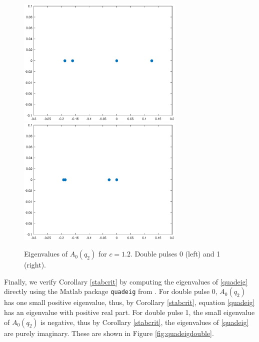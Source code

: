 \documentclass[12pt]{article}
\begin{document}
\begin{figure}[H]
\centering
\includegraphics[width=8cm]{specA0d1}
\includegraphics[width=8cm]{specA0d2}
\caption{Eigenvalues of $A_0(q_2)$ for $c = 1.2$. Double pulses 0 (left) and 1 (right).}
\label{fig:specA0double}
\end{figure}

Finally, we verify Corollary \ref{stabcrit} by computing the eigenvalues of \eqref{quadeig} directly using the Matlab package \texttt{quadeig} from \cite{Hammarling2013}. For double pulse 0, $A_0(q_2)$ has one small positive eigenvalue, thus, by Corollary \ref{stabcrit}, equation \eqref{quadeig} has an eigenvalue with positive real part. For double pulse 1, the small eigenvalue of $A_0(q_2)$ is negative, thus by Corollary \ref{stabcrit}, the eigenvalues of \eqref{quadeig} are purely imaginary. These are shown in Figure \ref{fig:quadeigdouble}.
\end{document}
